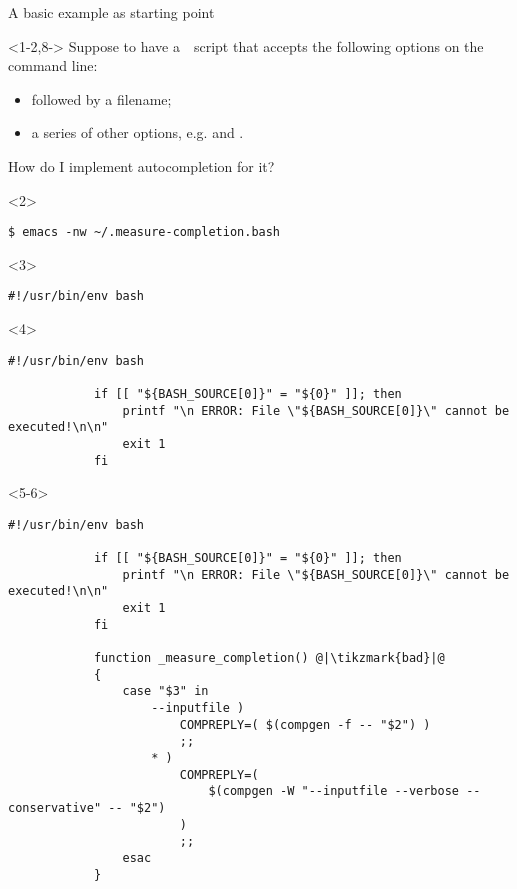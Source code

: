 \begin{frame}[fragile]{A basic example as starting point}
    \vspace{-1mm}
    \begin{onlyenv}<1-2,8->
        Suppose to have a \,\, script that accepts the following options on the command line:
        \begin{itemize}
            \item {} followed by a filename;
            \item a series of other options, e.g.  and .
        \end{itemize}
        How do I implement autocompletion for it?
        \begin{onlyenv}<2>
            \begin{lstlisting}[style=myBash, numbers=none, aboveskip=4mm]
                $ emacs -nw ~/.measure-completion.bash
            \end{lstlisting}
        \end{onlyenv}
    \end{onlyenv}
    \begin{onlyenv}<3>
        \begin{lstlisting}[style=myBash, numbers=none, style=smaller]
            #!/usr/bin/env bash
        \end{lstlisting}
    \end{onlyenv}
    \begin{onlyenv}<4>
        \begin{lstlisting}[style=myBash, numbers=none, style=smaller]
            #!/usr/bin/env bash

            if [[ "${BASH_SOURCE[0]}" = "${0}" ]]; then
                printf "\n ERROR: File \"${BASH_SOURCE[0]}\" cannot be executed!\n\n"
                exit 1
            fi
        \end{lstlisting}
    \end{onlyenv}
    \begin{onlyenv}<5-6>
        \begin{lstlisting}[style=myBash, numbers=none, style=smaller]
            #!/usr/bin/env bash

            if [[ "${BASH_SOURCE[0]}" = "${0}" ]]; then
                printf "\n ERROR: File \"${BASH_SOURCE[0]}\" cannot be executed!\n\n"
                exit 1
            fi

            function _measure_completion() @|\tikzmark{bad}|@
            {
                case "$3" in
                    --inputfile )
                        COMPREPLY=( $(compgen -f -- "$2") )
                        ;;
                    * )
                        COMPREPLY=(
                            $(compgen -W "--inputfile --verbose --conservative" -- "$2")
                        )
                        ;;
                esac
            }


\end{lstlisting}
\end{onlyenv}
\end{frame}
